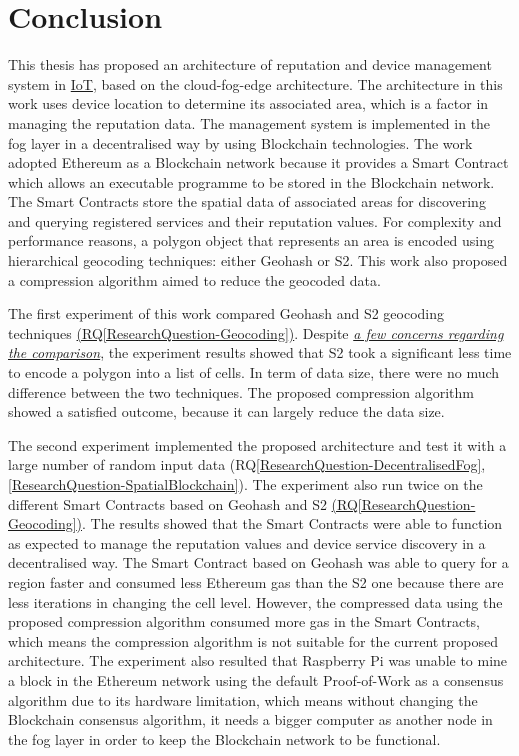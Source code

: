 \section*{Conclusion} \label{Conclusion-Conclusion}

\npara This thesis has proposed an architecture of reputation and device management system in \hyperref[Acronym-IoT]{IoT}, based on the cloud-fog-edge architecture.
The architecture in this work uses device location to determine its associated area, which is a factor in managing the reputation data.
The management system is implemented in the fog layer in a decentralised way by using Blockchain technologies.
The work adopted Ethereum as a Blockchain network because it provides a Smart Contract which allows an executable programme to be stored in the Blockchain network.
The Smart Contracts store the spatial data of associated areas for discovering and querying registered services and their reputation values.
For complexity and performance reasons, a polygon object that represents an area is encoded using hierarchical geocoding techniques: either Geohash or S2.
This work also proposed a compression algorithm aimed to reduce the geocoded data.

\npara The first experiment of this work compared Geohash and S2 geocoding techniques \hyperref[ResearchQuestion-Geocoding]{(RQ\ref{ResearchQuestion-Geocoding})}.
Despite \hyperref[Results-TechniqueComparison-Concern]{\textit{a few concerns regarding the comparison}}, the experiment results showed that S2 took a significant less time to encode a polygon into a list of cells.
In term of data size, there were no much difference between the two techniques.
The proposed compression algorithm showed a satisfied outcome, because it can largely reduce the data size.

\npara The second experiment implemented the proposed architecture and test it with a large number of random input data (RQ\ref{ResearchQuestion-DecentralisedFog}, \ref{ResearchQuestion-SpatialBlockchain}).
The experiment also run twice on the different Smart Contracts based on Geohash and S2 \hyperref[ResearchQuestion-Geocoding]{(RQ\ref{ResearchQuestion-Geocoding})}.
The results showed that the Smart Contracts were able to function as expected to manage the reputation values and device service discovery in a decentralised way.
The Smart Contract based on Geohash was able to query for a region faster and consumed less Ethereum gas than the S2 one because there are less iterations in changing the cell level.
However, the compressed data using the proposed compression algorithm consumed more gas in the Smart Contracts, which means the compression algorithm is not suitable for the current proposed architecture.
The experiment also resulted that Raspberry Pi was unable to mine a block in the Ethereum network using the default Proof-of-Work as a consensus algorithm due to its hardware limitation, which means without changing the Blockchain consensus algorithm, it needs a bigger computer as another node in the fog layer in order to keep the Blockchain network to be functional.

